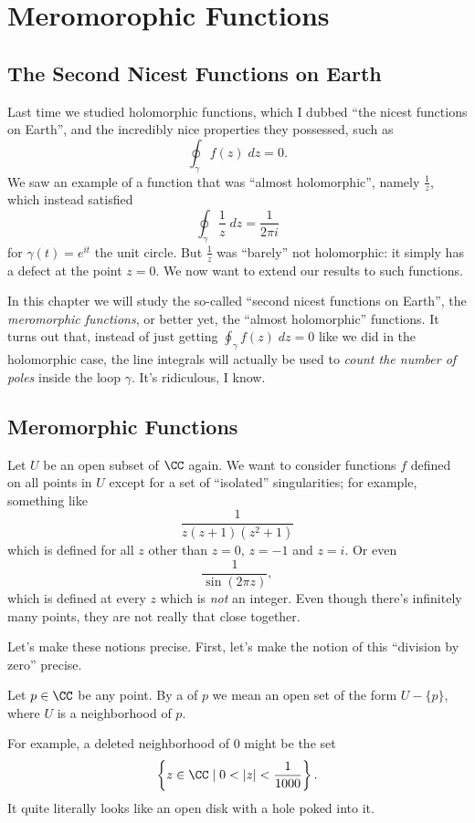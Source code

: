 \chapter{Meromorophic Functions}
\section{The Second Nicest Functions on Earth}
Last time we studied holomorphic functions, which I dubbed ``the nicest functions on Earth'',
and the incredibly nice properties they possessed, such as
\[
	\oint_\gamma f(z) \; dz = 0.
\]
We saw an example of a function that was ``almost holomorphic'', namely $\frac 1z$, which instead satisfied
\[
	\oint_{\gamma} \frac 1z \; dz
	= \frac{1}{2\pi i}
\]
for $\gamma(t) = e^{it}$ the unit circle.
But $\frac 1z$ was ``barely'' not holomorphic: it simply has a defect at the point $z=0$.
We now want to extend our results to such functions.

In this chapter we will study the so-called ``second nicest functions on Earth'',
the \emph{meromorphic functions}, or better yet, the ``almost holomorphic'' functions.
It turns out that, instead of just getting $\oint_\gamma f(z) \; dz = 0$ like we did in
the holomorphic case, the line integrals will actually be used to \emph{count the number of poles}
inside the loop $\gamma$. It's ridiculous, I know.

\section{Meromorphic Functions}

Let $U$ be an open subset of $\CC$ again.
We want to consider functions $f$ defined on all points in $U$
except for a set of ``isolated'' singularities;
for example, something like \[ \frac{1}{z(z+1)(z^2+1)} \] which is defined
for all $z$ other than $z=0$, $z=-1$ and $z=i$.
Or even \[ \frac{1}{\sin(2\pi z)}, \] which is defined at every $z$ which is \emph{not} an integer.
Even though there's infinitely many points, they are not really that close together.

Let's make these notions precise.
First, let's make the notion of this ``division by zero'' precise.
\begin{definition}
	Let $p \in \CC$ be any point.
	By a  of $p$ we mean an open set of the form $U - \{p\}$,
	where $U$ is a neighborhood of $p$.
\end{definition}
\begin{example}
	For example, a deleted neighborhood of $0$ might be the set
	\[ \left\{ z \in \CC \mid 0 < \left\lvert z \right\rvert < \frac{1}{1000} \right\}. \]
	It quite literally looks like an open disk with a hole poked into it.
\end{example}

